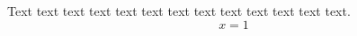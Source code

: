 \documentclass{elsarticle}
\begin{document}
Text text text text text text text text text text text text text.
\begin{equation}x=1\end{equation}
\end{document}
